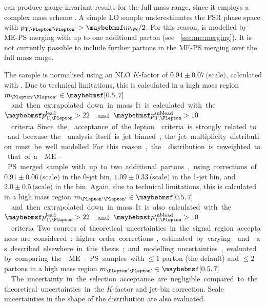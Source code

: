 \sherpa can produce gauge-invariant results for the full mass range, since it employs a 
complex mass scheme \cite{Sherpa:Wgstar}. A simple LO \sherpa sample underestimates the FSR 
phase space with $p_{\text{T,\HepProcess{\Plepton'\Plepton'}}} > \mW/2$. For this reason, 
\Wgstar is modelled by ME-PS merging with up to one additional parton (see 
\Section~\ref{sec:mc:merging}). It is not currently possible to include further partons 
in the ME-PS merging over the full mass range.

The \sherpa sample is normalised using an NLO $K$-factor of $0.94\pm0.07\,\text{(scale)}$, 
calculated with \mcfm. Due to technical limitations, this is calculated in a high mass 
region \unit{$m_{\HepProcess{\Plepton'\Plepton'}} \in \hardrange{0.5,7}$}{\GeV} and then 
extrapolated down in mass. It is calculated with the \unit{$\ptleadlep > 22$}{\GeV} and 
\unit{$\ptsubleadlep > 10$}{\GeV} criteria.

Since the \Wgstar acceptance of the lepton \pt criteria is strongly related to \njets and 
because the \HWW analysis itself is jet binned, the jet multiplicity distribution must be 
well modelled. For this reason, the \njets distribution is reweighted to that of a \sherpa 
ME-PS merged sample with up to two additional partons, using corrections of 
$0.91\pm0.06\,\text{(scale)}$ in the 0-jet bin, $1.09\pm0.33\,\text{(scale)}$ in the 1-jet 
bin, and $2.0\pm0.5\,\text{(scale)}$ in the \twojet bin. Again, due to technical 
limitations, this is calculated in a high mass region 
\unit{$m_{\HepProcess{\Plepton'\Plepton'}} \in \hardrange{0.5,7}$}{\GeV} and then 
extrapolated down in mass. It is also calculated with the 
\unit{$\ptleadlep > 22$}{\GeV} and \unit{$\ptsubleadlep > 10$}{\GeV} criteria.

Two sources of theoretical uncertainties in the signal region acceptances are considered: 
higher order corrections, estimated by varying \mur and \muf as described elsewhere in 
this thesis; and modelling uncertainties, evaluated by comparing the \sherpa ME-PS 
samples with $\leq\!1$ parton (the default) and $\leq\!2$ partons in a high mass region 
\unit{$m_{\HepProcess{\Plepton'\Plepton'}} \in \hardrange{0.5,7}$}{\GeV}. The uncertainty in 
the selection acceptance are negligible compared to the theoretical uncertainties in the 
$K$-factor and jet-bin correction. Scale uncertainties in the shape of the \mt distribution 
are also evaluated.


